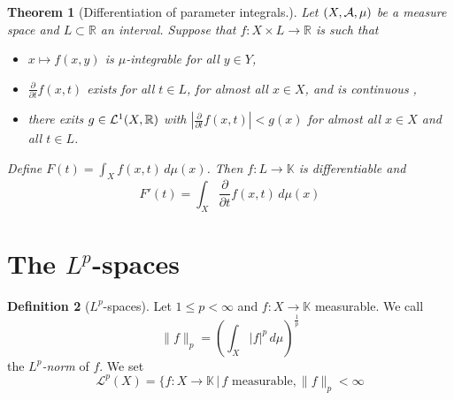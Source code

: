 \documentclass[10pt, oneside, reqno]{amsart}
\theoremstyle{plain}%
\newtheorem{thm}{Theorem}[section]
\theoremstyle{definition}
\newtheorem{defn}[thm]{Definition}
\theoremstyle{remark}
\newcommand{\R}{\mathbb{R}}
\newcommand{\dmu}{\, d \mu}
\begin{document}
\begin{thm}[Differentiation of parameter integrals.]
    Let $(X, \mathcal{A}, \mu)$ be a measure space and $L \subset \R$ an interval.  Suppose that $f: X \times L \rightarrow \R$ is such that 
    \begin{itemize}
        \item $x \mapsto f(x,y)$ is $\mu$-integrable for all $y \in Y$,
        \item $\frac{\partial}{\partial t} f(x,t)$ exists for all $t \in L$, for almost all $x \in X$, and is continuous ,
        \item there exits $g \in \ellone{\R}$ with $|\frac{\partial}{\partial t} f(x,t)| < g(x)$ for almost all $x \in X$ and all $t \in L$.   
        
    \end{itemize}
    
    Define $F(t) = \int_X f(x,t) \dmu(x)$.  Then $f : L \rightarrow \mathbb{K}$ is differentiable and \[
        F'(t) = \int_X \frac{\partial}{\partial t} f(x,t) \dmu(x)
    \]
\end{thm}




























\newcommand{\K}{\mathbb{K}}
\newcommand{\ellp}[1]{\mathcal{L}^{#1}(X)}
\newcommand{\Lp}[1]{L^{#1}(X)}

\section{The $L^p$-spaces} %
\label{sec:the_l_p_spaces}



\begin{defn}[$L^p$-spaces]
    Let $1 \leq p < \infty$ and $f:X \rightarrow \K$ measurable. We call \[
        \| f \|_p = \left(\int_X |f|^p \dmu\right)^\frac{1}{p}
    \]
    the \emph{$L^p$-norm} of $f$.  We set \[
        \ellp{p} = \{ f: X \rightarrow \K \, | \, f \text{ measurable}, \| f \|_p < \infty
    \]  
\end{defn}
\end{document}
